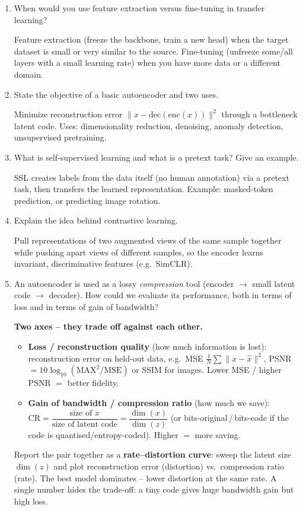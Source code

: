 \documentclass[10pt,a4paper]{article}
\newcommand{\q}[1]{\item #1}
\begin{document}
\begin{enumerate}[leftmargin=*,label=\textbf{Q\arabic*.}]

\q When would you use feature extraction versus fine-tuning in transfer learning?
\begin{answerbox}
Feature extraction (freeze the backbone, train a new head) when the target dataset is small or very similar to the source. Fine-tuning (unfreeze some/all layers with a small learning rate) when you have more data or a different domain.
\end{answerbox}

\q State the objective of a basic autoencoder and two uses.
\begin{answerbox}
Minimize reconstruction error $\|x - \mathrm{dec}(\mathrm{enc}(x))\|^2$ through a bottleneck latent code. Uses: dimensionality reduction, denoising, anomaly detection, unsupervised pretraining.
\end{answerbox}

\q What is self-supervised learning and what is a pretext task? Give an example.
\begin{answerbox}
SSL creates labels from the data itself (no human annotation) via a pretext task, then transfers the learned representation. Example: masked-token prediction, or predicting image rotation.
\end{answerbox}

\q Explain the idea behind contrastive learning.
\begin{answerbox}
Pull representations of two augmented views of the same sample together while pushing apart views of different samples, so the encoder learns invariant, discriminative features (e.g.\ SimCLR).
\end{answerbox}

\q An autoencoder is used as a lossy \emph{compression} tool (encoder $\to$ small latent code $\to$ decoder). How could we evaluate its performance, both in terms of loss and in terms of gain of bandwidth?
\begin{answerbox}
\textbf{Two axes -- they trade off against each other.}
\begin{itemize}[leftmargin=1.2em]
  \item \textbf{Loss / reconstruction quality} (how much information is lost):
  reconstruction error on held-out data, e.g.\ MSE $\frac{1}{N}\sum\|x-\hat{x}\|^2$,
  PSNR $=10\log_{10}(\mathrm{MAX}^2/\mathrm{MSE})$ or SSIM for images. Lower MSE / higher PSNR $=$ better fidelity.
  \item \textbf{Gain of bandwidth / compression ratio} (how much we save):
  $\text{CR}=\dfrac{\text{size of }x}{\text{size of latent code}}=\dfrac{\dim(x)}{\dim(z)}$
  (or bits-original\,/\,bits-code if the code is quantised/entropy-coded). Higher $=$ more saving.
\end{itemize}
Report the pair together as a \textbf{rate--distortion curve}: sweep the latent size $\dim(z)$ and plot reconstruction error (distortion) vs.\ compression ratio (rate). The best model dominates -- lower distortion at the same rate. A single number hides the trade-off: a tiny code gives huge bandwidth gain but high loss.
\end{answerbox}


\end{enumerate}
\end{document}
